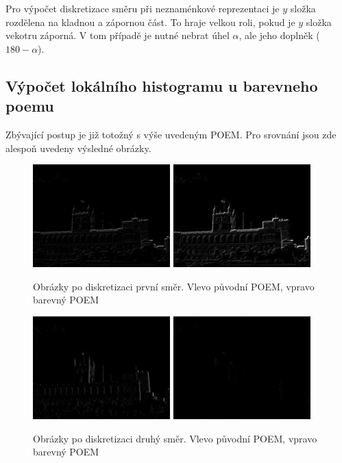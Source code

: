 \documentclass{report}
\begin{document}
\par Pro výpočet diskretizace směru při neznaménkové reprezentaci je $y$ složka rozdělena na kladnou a zápornou část. To hraje velkou roli, pokud je $y$ složka vekotru záporná. V tom případě je nutné nebrat úhel $\alpha$, ale jeho doplněk ($ 180 - \alpha$).

\subsection{Výpočet lokálního histogramu u barevneho poemu}
Zbývající postup je již totožný s výše uvedeným POEM. Pro srovnání jsou zde alespoň uvedeny výsledné obrázky. 

\begin{figure}[H]
	\centering
	\includegraphics[width=150pt]{./img/aems0.jpg}
	\includegraphics[width=150pt]{./img/aems_3_0.jpg}
	\caption{Obrázky po diskretizaci první směr. Vlevo původní POEM, vpravo barevný POEM}
\end{figure}
\begin{figure}[H]
	\centering
	\includegraphics[width=150pt]{./img/aems1.jpg}
	\includegraphics[width=150pt]{./img/aems_3_1.jpg}
	\caption{Obrázky po diskretizaci druhý směr. Vlevo původní POEM, vpravo barevný POEM}
\end{figure}
\end{document}
